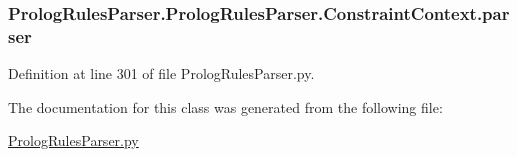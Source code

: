 \subsubsection[{parser}]{\setlength{\rightskip}{0pt plus 5cm}Prolog\+Rules\+Parser.\+Prolog\+Rules\+Parser.\+Constraint\+Context.\+parser}\label{class_prolog_rules_parser_1_1_prolog_rules_parser_1_1_constraint_context_ac610adf034c82d60388f8bf8695c3f34}


Definition at line 301 of file Prolog\+Rules\+Parser.\+py.



The documentation for this class was generated from the following file\+:\begin{DoxyCompactItemize}
\item 
\hyperlink{_prolog_rules_parser_8py}{Prolog\+Rules\+Parser.\+py}\end{DoxyCompactItemize}
